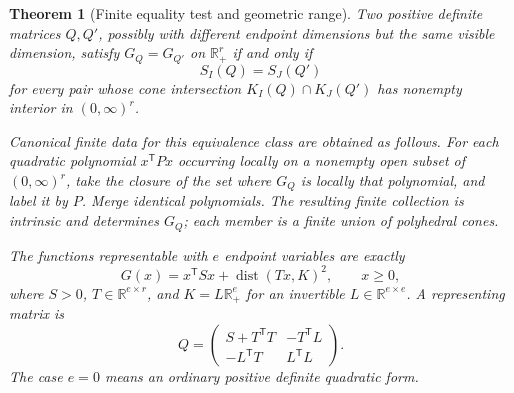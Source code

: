 \documentclass[11pt,reqno]{amsart}
\numberwithin{equation}{section}
\newtheorem{theorem}{Theorem}[section]
\theoremstyle{definition}
\theoremstyle{remark}
\newcommand{\R}{\mathbb R}
\newcommand{\dist}{\operatorname{dist}}
\begin{document}
\begin{theorem}[Finite equality test and geometric range]\label{thm:endpoint-class}
Two positive definite matrices $Q,Q'$, possibly with different endpoint dimensions but the same visible dimension, satisfy $G_Q=G_{Q'}$ on $\R_+^r$ if and only if
\begin{equation}\label{eq:finite-equality}
 S_I(Q)=S_J(Q')
\end{equation}
for every pair whose cone intersection $K_I(Q)\cap K_J(Q')$ has nonempty interior in $(0,\infty)^r$.

Canonical finite data for this equivalence class are obtained as follows. For each quadratic polynomial $x^{\mathsf T}Px$ occurring locally on a nonempty open subset of $(0,\infty)^r$, take the closure of the set where $G_Q$ is locally that polynomial, and label it by $P$. Merge identical polynomials. The resulting finite collection is intrinsic and determines $G_Q$; each member is a finite union of polyhedral cones.

The functions representable with $e$ endpoint variables are exactly
\begin{equation}\label{eq:cone-range}
 G(x)=x^{\mathsf T}Sx+\dist(Tx,K)^2,\qquad x\ge0,
\end{equation}
where $S>0$, $T\in\R^{e\times r}$, and $K=L\R_+^e$ for an invertible $L\in\R^{e\times e}$. A representing matrix is
\begin{equation}\label{eq:range-matrix}
 Q=\begin{pmatrix}S+T^{\mathsf T}T&-T^{\mathsf T}L\\-L^{\mathsf T}T&L^{\mathsf T}L\end{pmatrix}.
\end{equation}
The case $e=0$ means an ordinary positive definite quadratic form.
\end{theorem}
\end{document}
